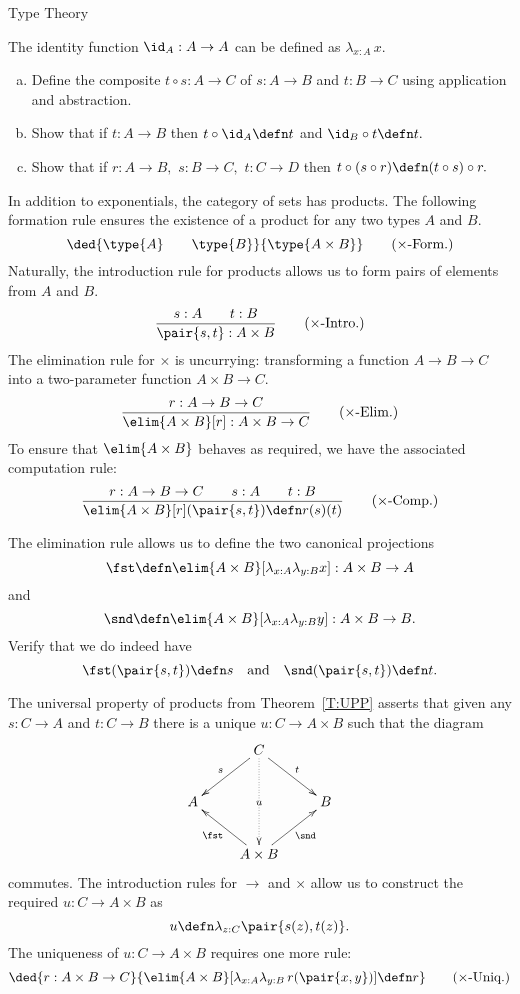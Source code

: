 \begin{unit}{Type Theory}
\begin{problem}
  The identity function \(\id_A:A \to A\) can be defined as \(\lambda_{x:A}\,x.\)
  \begin{enumerate}[(a)]
  \item Define the composite \(t \circ s : A \to C\) of \(s:A \to B\) and \(t:B \to C\) using application and abstraction.
  \item Show that if \(t:A \to B\) then \(t \circ \id_A \defn t\) and \(\id_B \circ t \defn t.\)
  \item Show that if \(r:A \to B,\) \(s:B \to C,\) \(t:C \to D\)  then \(t \circ (s \circ r) \defn (t \circ s) \circ r.\)
  \end{enumerate}
\end{problem}

In addition to exponentials, the category of sets has products.
The following formation rule ensures the existence of a product for any two types \(A\) and \(B.\)
\[\ded{\type{A} \qquad \type{B}}{\type{A \times B}} \tag{$\times$-Form.}\]
Naturally, the introduction rule for products allows us to form pairs of elements from \(A\) and \(B.\)
\[\frac{s : A \qquad t : B}{\pair{s,t} : A \times B} \tag{$\times$-Intro.}\]
The elimination rule for \(\times\) is uncurrying: transforming a function \(A \to B \to C\) into a two-parameter function \(A \times B \to C.\)
\[\frac{r : A \to B \to C}{\elim{A\times B}[r]:A \times B \to C} \tag{$\times$-Elim.}\]
To ensure that \(\elim{A \times B}\) behaves as required, we have the associated computation rule:
\[\frac{r : A \to B \to C \qquad s : A \qquad t : B}{\elim{A\times B}[r](\pair{s,t}) \defn r(s)(t)} \tag{$\times$-Comp.}\]

\begin{problem}
  The elimination rule allows us to define the two canonical projections
  \[\fst \defn \elim{A\times B}[\lambda_{x:A}\lambda_{y:B}x] : A \times B \to A\]
  and
  \[\snd \defn \elim{A\times B}[\lambda_{x:A}\lambda_{y:B}y] : A \times B \to B.\]
  Verify that we do indeed have \[\fst(\pair{s,t}) \defn s \quad\text{and}\quad \snd(\pair{s,t}) \defn t.\]
\end{problem}

The universal property of products from Theorem~\ref{T:UPP} asserts that given any \(s: C \to A\) and \(t: C \to B\) there is a unique \(u: C \to A \times B\) such that the diagram
\[\xymatrix{
  & C \ar@{.>}[dd]|{u} \ar[dl]_-{s} \ar[dr]^-{t} \\
  A & & B \\
  & A \times B \ar[ul]^-{\fst} \ar[ur]_-{\snd} 
}\]
commutes.
The introduction rules for \(\to\) and \(\times\) allow us to construct the required \(u:C \to A \times B\) as \[u \defn \lambda_{z:C} \pair{s(z),t(z)}.\]
The uniqueness of \(u: C \to A \times B\) requires one more rule:
\[\ded{r:A \times B \to C}{\elim{A \times B}[\lambda_{x:A}\lambda_{y:B}\,r(\pair{x,y})] \defn r} \tag{$\times$-Uniq.}\]


\end{unit}
